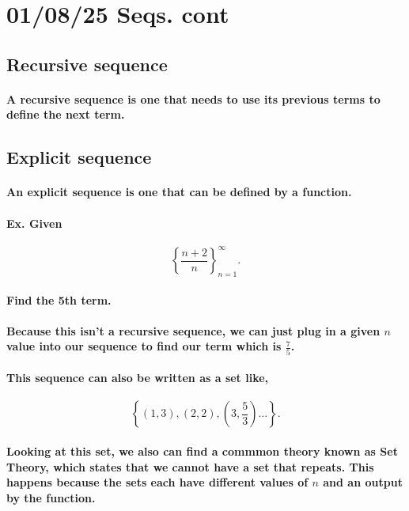 \section*{01/08/25 Seqs. cont}%
\label{sec:01/08/25 Seqs. cont}

\subsection{Recursive sequence}%
\label{sub:Recursive sequence}
\paragraph{A recursive sequence is one that needs to use its previous terms to define the next term.}

\subsection{Explicit sequence}%
\label{sub:Explict sequence}

\paragraph{An explicit sequence is one that can be defined by a function.}

\paragraph{Ex. Given}

\[
	\left\{\frac{n+2}{n}\right\}_{n=1}^{\infty}
.\] 
\paragraph{Find the 5th term.}
\paragraph{Because this isn't a recursive sequence, we can just plug in a given $n$ value into our sequence to find our term which is $\frac{7}{5}$. }

\paragraph{This sequence can also be written as a set like,}

\[
	\left\{\left( 1,3 \right), \left( 2,2 \right), \left( 3,\frac{5}{3} \right) \ldots \right\} 
.\] 

\paragraph{Looking at this set, we also can find a commmon theory known as Set Theory, which states that we cannot have a set that repeats. This happens because the sets each have different values of $n$ and an output by the function. }

